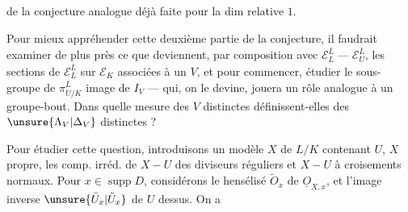de la conjecture analogue déjà faite pour la dim relative $1$.

Pour mieux appréhender cette deuxième partie  de la conjecture, il faudrait examiner de plus près ce que deviennent, par composition avec $\mathcal E_L^{\bar L}\mathrel{\text{---}}\mathcal E_U^{\bar L}$, les sections de $\mathcal E_L^{\bar L}$ sur $\mathcal E_K$ associées à un $V$, et pour commencer, étudier le sous-groupe  de $\pi_{U/K}^{\bar L}$ image de $I_V$ --- qui, on le devine, jouera un rôle analogue à un groupe-bout. Dans quelle mesure des $V$ distinctes définissent-elles des $\unsure{\Lambda_V|\Delta_V}$ distinctes ?

Pour étudier cette question, introduisons un modèle $X$ de $L/K$ contenant $U$, $X$ propre, les comp. irréd. de  $X-U$ des diviseurs réguliers  et $X-U$ à croisements normaux. Pour $x\in\operatorname{supp}D$, considérons le hensélisé  $\tilde O_x$ de $\underline{O}_{X,x}$, et l'image inverse $\unsure{\bar U_x|\tilde U_x}$ de $U$ dessus. On a
